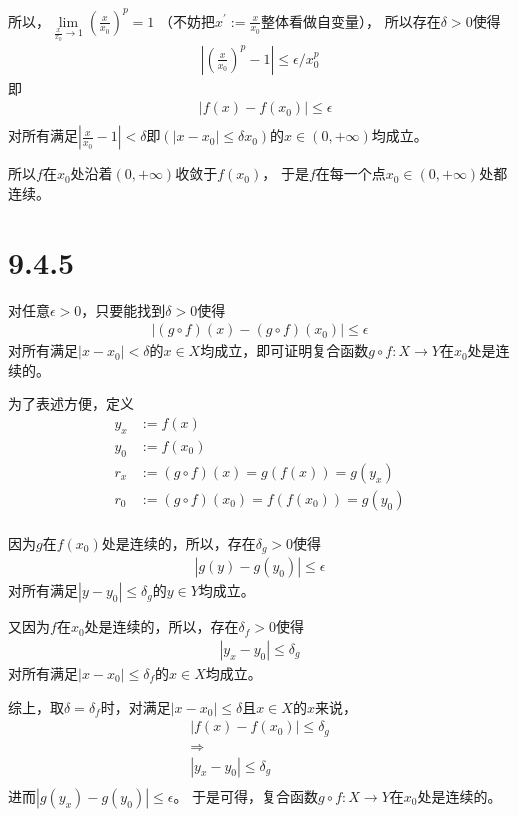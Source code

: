 \documentclass{article}
\begin{document}
所以，$\lim\limits_{\frac{x}{x_0} \rightarrow 1} (\frac{x}{x_0})^p = 1$
（不妨把$x^\prime := \frac{x}{x_0}$整体看做自变量），
所以存在$\delta > 0$使得
\begin{align*}
  | (\frac{x}{x_0})^p - 1 | \leq \epsilon / x_0^p
\end{align*}
即
\begin{align*}
   & |f(x) - f(x_0)| \leq \epsilon \\
\end{align*}
对所有满足$|\frac{x}{x_0} - 1| < \delta$即$(|x - x_0| \leq \delta x_0)$的$x \in (0, +\infty)$均成立。

所以$f$在$x_0$处沿着$(0, +\infty)$收敛于$f(x_0)$，
于是$f$在每一个点$x_0 \in (0, +\infty)$处都连续。

\section*{9.4.5}
对任意$\epsilon > 0$，只要能找到$\delta > 0$使得
\begin{align*}
  |(g \circ f)(x) - (g \circ f)(x_0)| \leq \epsilon
\end{align*}
对所有满足$|x - x_0| < \delta$的$x \in X$均成立，即可证明复合函数$g \circ f: X \rightarrow Y$在$x_0$处是连续的。

为了表述方便，定义
\begin{align*}
  y_x & := f(x)                                  \\
  y_0 & := f(x_0)                                \\
  r_x & := (g \circ f)(x) = g(f(x))  = g(y_x)    \\
  r_0 & := (g \circ f)(x_0) = f(f(x_0)) = g(y_0) \\
\end{align*}

因为$g$在$f(x_0)$处是连续的，所以，存在$\delta_{g} > 0$使得
\begin{align*}
  |g(y) - g(y_0)| \leq \epsilon
\end{align*}
对所有满足$|y - y_0| \leq \delta_{g}$的$y \in Y$均成立。

又因为$f$在$x_0$处是连续的，所以，存在$\delta_{f} > 0$使得
\begin{align*}
  |y_x - y_0| \leq \delta_{g}
\end{align*}
对所有满足$|x - x_0| \leq \delta_{f}$的$x \in X$均成立。

综上，取$\delta = \delta_{f}$时，对满足$|x - x_0| \leq \delta$且$x \in X$的$x$来说，
\begin{align*}
  |f(x) - f(x_0)| \leq \delta_{g} \\
  \Rightarrow                     \\
  |y_x - y_0| \leq \delta_{g}     \\
\end{align*}
进而$|g(y_x) - g(y_0)| \leq \epsilon$。
于是可得，复合函数$g \circ f: X \rightarrow Y$在$x_0$处是连续的。
\end{document}
